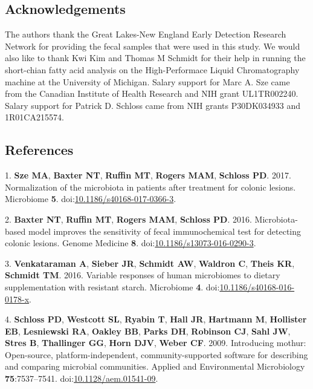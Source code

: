 \documentclass[11pt,]{article}
\begin{document}
\newpage

\subsection{Acknowledgements}\label{acknowledgements}

The authors thank the Great Lakes-New England Early Detection Research
Network for providing the fecal samples that were used in this study. We
would also like to thank Kwi Kim and Thomas M Schmidt for their help in
running the short-chian fatty acid analysis on the High-Performace
Liquid Chromatography machine at the University of Michigan. Salary
support for Marc A. Sze came from the Canadian Institute of Health
Research and NIH grant UL1TR002240. Salary support for Patrick D.
Schloss came from NIH grants P30DK034933 and 1R01CA215574.

\newpage

\subsection{References}\label{references}

\hypertarget{refs}{}
\hypertarget{ref-normalization_sze2017}{}
1. \textbf{Sze MA}, \textbf{Baxter NT}, \textbf{Ruffin MT},
\textbf{Rogers MAM}, \textbf{Schloss PD}. 2017. Normalization of the
microbiota in patients after treatment for colonic lesions. Microbiome
\textbf{5}.
doi:\href{https://doi.org/10.1186/s40168-017-0366-3}{10.1186/s40168-017-0366-3}.

\hypertarget{ref-crc_model_baxter2016}{}
2. \textbf{Baxter NT}, \textbf{Ruffin MT}, \textbf{Rogers MAM},
\textbf{Schloss PD}. 2016. Microbiota-based model improves the
sensitivity of fecal immunochemical test for detecting colonic lesions.
Genome Medicine \textbf{8}.
doi:\href{https://doi.org/10.1186/s13073-016-0290-3}{10.1186/s13073-016-0290-3}.

\hypertarget{ref-scfa_measures_venkataraman2016}{}
3. \textbf{Venkataraman A}, \textbf{Sieber JR}, \textbf{Schmidt AW},
\textbf{Waldron C}, \textbf{Theis KR}, \textbf{Schmidt TM}. 2016.
Variable responses of human microbiomes to dietary supplementation with
resistant starch. Microbiome \textbf{4}.
doi:\href{https://doi.org/10.1186/s40168-016-0178-x}{10.1186/s40168-016-0178-x}.

\hypertarget{ref-Schloss2009}{}
4. \textbf{Schloss PD}, \textbf{Westcott SL}, \textbf{Ryabin T},
\textbf{Hall JR}, \textbf{Hartmann M}, \textbf{Hollister EB},
\textbf{Lesniewski RA}, \textbf{Oakley BB}, \textbf{Parks DH},
\textbf{Robinson CJ}, \textbf{Sahl JW}, \textbf{Stres B},
\textbf{Thallinger GG}, \textbf{Horn DJV}, \textbf{Weber CF}. 2009.
Introducing mothur: Open-source, platform-independent,
community-supported software for describing and comparing microbial
communities. Applied and Environmental Microbiology
\textbf{75}:7537--7541.
doi:\href{https://doi.org/10.1128/aem.01541-09}{10.1128/aem.01541-09}.
\end{document}
